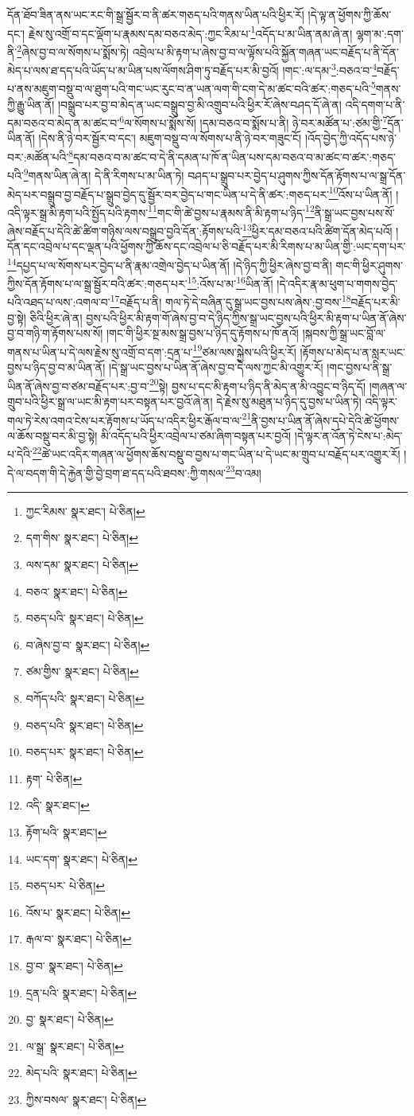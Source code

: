 དོན་ཐོབ་ཟིན་ནས་ཡང་རང་གི་སྒྲ་སྦྱོར་བ་ནི་ཚར་གཅད་པའི་གནས་ཡིན་པའི་ཕྱིར་རོ། །དེ་ལྟ་ན་ཕྱོགས་ཀྱི་ཆོས་དང་། རྗེས་སུ་འགྲོ་བ་དང་ལྡོག་པ་རྣམས་དམ་བཅའ་མེད་:ཀྱང་རིམ་པ་\footnote{ཀྱང་རིམས་  སྣར་ཐང་།  པེ་ཅིན། }འདོད་པ་མ་ཡིན་ནམ་ཞེ་ན། ལྷག་མ་:དག་ནི་\footnote{དག་གིས་  སྣར་ཐང་།  པེ་ཅིན། }ཞེས་བྱ་བ་ལ་སོགས་པ་སྨོས་ཏེ། འབྲེལ་པ་མི་རྟག་པ་ཞེས་བྱ་བ་ལ་ལྟོས་པའི་སྐྱོན་གཞན་ཡང་བརྗོད་པ་ནི་དོན་མེད་པ་ལས་ཐ་དད་པའི་ཡོད་པ་མ་ཡིན་པས་ལོགས་ཤིག་ཏུ་བརྗོད་པར་མི་བྱའོ། །གང་:ལ་དམ་\footnote{ལས་དམ་  སྣར་ཐང་།  པེ་ཅིན། }:བཅའ་བ་\footnote{བཅའ་  སྣར་ཐང་།  པེ་ཅིན། }བརྗོད་པ་ནས་མཇུག་བསྡུ་བ་ལ་ཐུག་པའི་གང་ཡང་རུང་བ་ན་ཡན་ལག་གི་ངག་དེ་མ་ཚང་བའི་ཚར་:གཅད་པའི་\footnote{བཅད་པའི་  སྣར་ཐང་།  པེ་ཅིན། }གནས་ཀྱི་རྒྱུ་ཡིན་ནོ། །བསྒྲུབ་པར་བྱ་བ་མེད་ན་ཡང་བསྒྲུབ་བྱ་མི་འགྲུབ་པའི་ཕྱིར་རོ་ཞེས་བཤད་དོ་ཞེ་ན། འདི་དགག་པ་ནི་དམ་བཅའ་བ་མེད་ན་མ་ཚང་བ་\footnote{བ་ཞེས་བྱ་བ་  སྣར་ཐང་།  པེ་ཅིན། }ལ་སོགས་པ་སྨོས་སོ། །དམ་བཅའ་བ་སྨོས་པ་ནི། ཉེ་བར་མཚོན་པ་:ཙམ་གྱི་\footnote{ཙམ་གྱིས་  སྣར་ཐང་།  པེ་ཅིན། }དོན་ཡིན་ནོ། །དེས་ནི་ཉེ་བར་སྦྱོར་བ་དང་། མཇུག་བསྡུ་བ་ལ་སོགས་པ་ནི་ཉེ་བར་གཟུང་ངོ། །འོད་བྱེད་ཀྱི་འདོད་པས་ཉེ་བར་:མཚོན་པའི་\footnote{བཀོད་པའི་  སྣར་ཐང་།  པེ་ཅིན། }དམ་བཅའ་བ་མ་ཚང་བ་དེ་ནི་དམན་པ་ཁོ་ན་ཡིན་པས་དམ་བཅའ་བ་མ་ཚང་བ་ཚར་:གཅད་པའི་\footnote{བཅད་པའི་  སྣར་ཐང་།  པེ་ཅིན། }གནས་ཡིན་ཞེ་ན། དེ་ནི་རིགས་པ་མ་ཡིན་ཏེ། བཤད་པ་སྒྲུབ་པར་བྱེད་པ་ཤུགས་ཀྱིས་དོན་རྟོགས་པ་ལ་སྒྲ་དོན་མེད་པར་བསྒྲུབ་བྱ་བརྗོད་པ་སྒྲུབ་བྱེད་དུ་སྦྱོར་བར་བྱེད་པ་གང་ཡིན་པ་དེ་ནི་ཚར་:གཅད་པར་\footnote{བཅད་པར་  སྣར་ཐང་།  པེ་ཅིན། }འོས་པ་ཡིན་ནོ། །འདི་ལྟར་སྒྲ་མི་རྟག་པའི་སྤྱོད་པའི་རྟགས་\footnote{རྟག་  པེ་ཅིན། }གང་གི་ཚེ་བྱས་པ་རྣམས་ནི་མི་རྟག་པ་ཉིད་\footnote{འདི་  སྣར་ཐང་། }ནི་སྒྲ་ཡང་བྱས་པས་སོ་ཞེས་བརྗོད་པ་དེའི་ཚེ་ཚིག་གཉིས་ལས་བསྒྲུབ་བྱའི་དོན་:རྟོགས་པའི་\footnote{རྟོག་པའི་  སྣར་ཐང་། }ཕྱིར་དམ་བཅའ་པའི་ཚིག་དོན་མེད་པའོ། །དོན་དང་འབྲེལ་པ་དང་ལྡན་པའི་ཕྱོགས་ཀྱི་ཆོས་དང་འབྲེལ་པ་ཅི་བརྗོད་པར་མི་རིགས་པ་མ་ཡིན་གྱི་:ཡང་དག་པར་\footnote{ཡང་དག་  སྣར་ཐང་།  པེ་ཅིན། }དཔྱད་པ་ལ་སོགས་པར་བྱེད་པ་ནི་རྣམ་འགྲེལ་བྱེད་པ་ཡིན་ནོ། །དེ་ཉིད་ཀྱི་ཕྱིར་ཞེས་བྱ་བ་ནི། གང་གི་ཕྱིར་ཤུགས་ཀྱིས་དོན་རྟོགས་པ་ལ་སྒྲ་སྦྱོར་བའི་ཚར་:གཅད་པར་\footnote{བཅད་པར་  པེ་ཅིན། }:འོས་པ་མ་\footnote{འོས་པ་  སྣར་ཐང་།  པེ་ཅིན། }ཡིན་ནོ། །དེ་འདིར་རྣ་མ་ཕུག་པ་གགས་བྱེད་པའི་འཐད་པ་ལས་:འགལ་བ་\footnote{རྒལ་བ་  སྣར་ཐང་།  པེ་ཅིན། }བརྗོད་པ་ནི། གལ་ཏེ་དེ་བཞིན་དུ་སྒྲ་ཡང་བྱས་པས་ཞེས་:བྱ་བས་\footnote{བྱ་བ་  སྣར་ཐང་།  པེ་ཅིན། }བརྗོད་པར་མི་བྱ་སྟེ། ཅིའི་ཕྱིར་ཞེ་ན། བྱས་པའི་ཕྱིར་མི་རྟག་གོ་ཞེས་བྱ་བ་དེ་ཉིད་ཀྱིས་སྒྲ་ཡང་བྱས་པའི་ཕྱིར་མི་རྟག་པ་ཡིན་ནོ་ཞེས་བྱ་བ་གཉི་ག་རྟོགས་པས་སོ། །གང་གི་ཕྱིར་སྔ་མས་སྒྲ་བྱས་པ་ཉིད་དུ་རྟོགས་པ་ཁོ་ནའོ། །སྐབས་ཀྱི་སྒྲ་ཡང་བློ་ལ་གནས་པ་ཡིན་པ་དེ་ལས་རྗེས་སུ་འགྲོ་བ་དག་:དྲན་པ་\footnote{དྲན་པའི་  སྣར་ཐང་།  པེ་ཅིན། }ཙམ་ལས་སྐྱེས་པའི་ཕྱིར་རོ། །རྟོགས་པ་མེད་པ་ན་སླར་ཡང་བྱས་པ་ཉིད་བྱ་བ་མ་ཡིན་ནོ། །དེ་སྒྲ་ཡང་བྱས་པ་ཡིན་ནོ་ཞེས་བྱ་བ་དེ་ལས་ཀྱང་མི་འགྱུར་རོ། །གང་བྱས་པ་ནི་སྒྲ་ཡིན་ནོ་ཞེས་བྱ་བ་ཙམ་བརྗོད་པར་:བྱ་བ་\footnote{བྱ་  སྣར་ཐང་།  པེ་ཅིན། }སྟེ། བྱས་པ་དང་མི་རྟག་པ་ཉིད་ནི་མེད་ན་མི་འབྱུང་བ་ཉིད་དོ། །གཞན་ལ་གྲུབ་པའི་ཕྱིར་སྒྲ་ལ་ཡང་མི་རྟག་པར་བསྟན་པར་བྱའོ་ཞེ་ན། དེ་རྗེས་སུ་མཐུན་པ་ཉིད་དུ་བྱས་པ་ཡིན་ཏེ། འདི་ལྟར་གལ་ཏེ་རེས་འགའ་ངེས་པར་རྟོགས་པ་ཡོད་པ་འདིར་ཕྱིར་རྒོལ་བ་ལ་\footnote{ལ་སྒྲ་  སྣར་ཐང་།  པེ་ཅིན། }ནི་བྱས་པ་ཡིན་ནོ་ཞེས་དཔེ་དེའི་ཚེ་ཕྱོགས་ལ་ཆོས་བསྡུ་བར་མི་བྱ་སྟེ། མི་འདོད་པའི་ཕྱིར་འབྲེལ་པ་ཙམ་ཞིག་བསྟན་པར་བྱའོ། །དེ་ལྟར་ན་འོན་ཏེ་ངེས་པ་:མེད་པ་དེའི་\footnote{མེད་པའི་  སྣར་ཐང་།  པེ་ཅིན། }ཚེ་ཡང་འདིར་གཞན་ལ་ཕྱོགས་ཆོས་བསྡུ་བ་བྱས་པ་གང་ཡིན་པ་དེ་ཡང་མ་གྲུབ་པ་བརྗོད་པར་འགྱུར་རོ། །དེ་ལ་བདག་གི་དེ་རྐྱེན་གྱི་བྱེ་བྲག་ཐ་དད་པའི་ཐབས་:ཀྱི་གསལ་\footnote{ཀྱིས་བསལ་  སྣར་ཐང་།  པེ་ཅིན། }བ་འམ། 